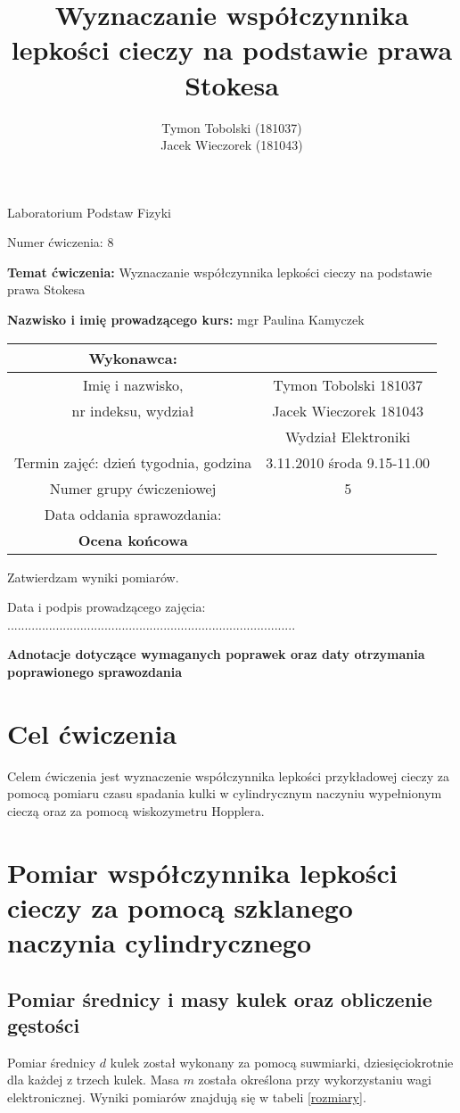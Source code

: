 \documentclass[wide,a4paper,titlepage,12pt]{mwart}
\title{Wyznaczanie współczynnika lepkości cieczy na podstawie prawa Stokesa}
\author{Tymon Tobolski (181037)\\Jacek Wieczorek (181043)}
\makeatletter
\renewcommand{\maketitle}{
\begin{titlepage}
  \begin{center}
    \vspace*{3cm}
    \LARGE Laboratorium Podstaw Fizyki \par
    \vspace{1cm}
    \normalsize Numer ćwiczenia: 8 \par
  \end{center}

  {\bf Temat ćwiczenia:} Wyznaczanie współczynnika lepkości cieczy na podstawie prawa Stokesa \par
  {\bf Nazwisko i imię prowadzącego kurs:} mgr Paulina Kamyczek \par

    \vspace{2cm}


  \begin{table}[h]
    \begin{center}
      \begin{tabular}{|c|c|}
			\hline
			Wykonawca:	& \\
			\hline
			Imię i nazwisko, & Tymon Tobolski 181037 \\
			nr indeksu, wydział & Jacek Wieczorek 181043 \\
			& Wydział Elektroniki \\
			\hline
			Termin zajęć: dzień tygodnia, godzina &	3.11.2010 środa 9.15-11.00 \\
			\hline
			Numer grupy ćwiczeniowej &	5 \\
			\hline
			Data oddania sprawozdania:	& \\
			\hline
			{\bf Ocena końcowa} & \\
			\hline
      \end{tabular}
    \end{center}
  \end{table}
 \vspace{2cm}
	Zatwierdzam wyniki pomiarów. \par
	Data i podpis prowadzącego zajęcia: ................................................................................... \par

 \vspace{2cm}
{\bf Adnotacje dotyczące wymaganych poprawek oraz daty otrzymania poprawionego sprawozdania}

\end{titlepage}
}
\makeatother
\begin{document}
  \maketitle

  \section{Cel ćwiczenia} %
  \label{sec:Cel}
    Celem ćwiczenia jest wyznaczenie współczynnika lepkości przykładowej cieczy za pomocą pomiaru czasu spadania kulki w cylindrycznym naczyniu wypełnionym cieczą oraz za pomocą wiskozymetru Hopplera. 
    
    
  
  \section{Pomiar współczynnika lepkości cieczy za pomocą szklanego naczynia cylindrycznego}
  
    \subsection{Pomiar średnicy i masy kulek oraz obliczenie gęstości}
    
    Pomiar średnicy $d$ kulek został wykonany za pomocą suwmiarki, dziesięciokrotnie dla każdej z trzech kulek. Masa $m$ została określona przy wykorzystaniu wagi elektronicznej. Wyniki pomiarów znajdują się w tabeli \ref{rozmiary}.
    \newline
  
\end{document}
